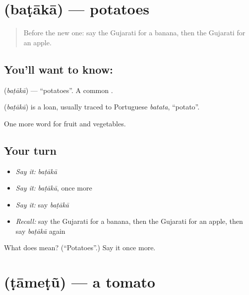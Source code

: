 \section[\texorpdfstring{\gu{બટાકા} (baṭākā)}{બટાકા (baṭākā)}]{ (baṭākā) — potatoes}

\label{lesson:GU-C59-potatoes}



\begin{quote}
Before the new one: say the Gujarati for a banana, then the Gujarati for an apple.
\end{quote}

\subsection*{You'll want to know: }
\textbf{} (\emph{baṭākā}) — \textquotedblleft{}potatoes\textquotedblright{}. A common \textbf{}.

\begin{cousinweb}
\textbf{} (\emph{baṭākā}) is a loan, usually traced to Portuguese \emph{batata}, \textquotedblleft{}potato\textquotedblright{}.
\end{cousinweb}

\begin{grammarlens}[title={What you've built}]
One more word for fruit and vegetables.
\end{grammarlens}

\subsection*{Your turn}
\begin{itemize}
\raggedright
  \item \emph{Say it:} \emph{baṭākā}
  \item \emph{Say it:} \emph{baṭākā}, once more
  \item \emph{Say it:} say \emph{baṭākā}
  \item \emph{Recall:} say the Gujarati for a banana, then the Gujarati for an apple, then say \emph{baṭākā} again
\end{itemize}

\begin{tcolorbox}[breakable,colback=teal!4,colframe=teal!35!black,title={Before you move on}]
What does  mean? (\textquotedblleft{}Potatoes\textquotedblright{}.) Say it once more.
\end{tcolorbox}
\section[\texorpdfstring{\gu{ટામેટું} (ṭāmeṭũ)}{ટામેટું (ṭāmeṭũ)}]{ (ṭāmeṭũ) — a tomato}


